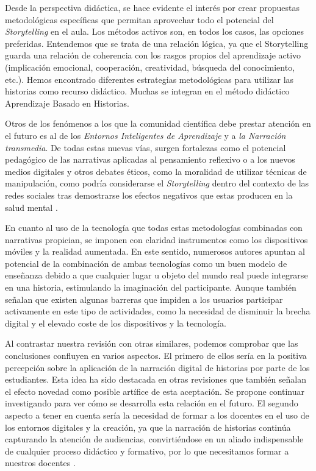 Desde la perspectiva didáctica, se hace evidente el interés por crear
propuestas metodológicas específicas que permitan aprovechar todo el
potencial del \emph{Storytelling} en el aula. Los métodos activos son,
en todos los casos, las opciones preferidas. Entendemos que se trata de
una relación lógica, ya que el Storytelling guarda una relación de
coherencia con los rasgos propios del aprendizaje activo (implicación
emocional, cooperación, creatividad, búsqueda del conocimiento, etc.).
Hemos encontrado diferentes estrategias metodológicas para utilizar las
historias como recurso didáctico. Muchas se integran en el método
didáctico Aprendizaje Basado en Historias.

Otros de los fenómenos a los que la comunidad científica debe prestar
atención en el futuro es al de los \emph{Entornos Inteligentes de
Aprendizaje} y a \emph{la Narración transmedia}. De todas estas nuevas
vías, surgen fortalezas como el potencial pedagógico de las narrativas
aplicadas al pensamiento reflexivo o a los nuevos medios digitales \cite{kim_digital_2021,yasar__2022} y otros debates éticos, como la
moralidad de utilizar técnicas de manipulación, como podría considerarse
el \emph{Storytelling} dentro del contexto de las redes sociales tras
demostrarse los efectos negativos que estas producen en la salud mental
\cite{sheldon_dark_2019}.

En cuanto al uso de la tecnología que todas estas metodologías
combinadas con narrativas propician, se imponen con claridad
instrumentos como los dispositivos móviles y la realidad aumentada. En
este sentido, numerosos autores \cite{aurelia_survey_nodate,dunleavy_augmented_2014,nam_designing_2015,nobrega_mobile_2017} apuntan al potencial de la combinación de ambas tecnologías como un buen modelo de enseñanza debido a que cualquier lugar u objeto del mundo real puede integrarse en una historia, estimulando la imaginación del participante. Aunque también señalan que existen algunas barreras que impiden a los usuarios participar activamente en este tipo de actividades, como la
necesidad de disminuir la brecha digital y el elevado coste de los
dispositivos y la tecnología.

Al contrastar nuestra revisión con otras similares, podemos comprobar
que las conclusiones confluyen en varios aspectos. El primero de ellos
sería en la positiva percepción sobre la aplicación de la narración
digital de historias por parte de los estudiantes. Esta idea ha sido
destacada en otras revisiones que también señalan el efecto novedad como
posible artífice de esta aceptación. Se propone continuar investigando
para ver cómo se desarrolla esta relación en el futuro. El segundo
aspecto a tener en cuenta sería la necesidad de formar a los docentes en
el uso de los entornos digitales y la creación, ya que la narración de
historias continúa capturando la atención de audiencias, convirtiéndose
en un aliado indispensable de cualquier proceso didáctico y formativo,
por lo que necesitamos formar a nuestros docentes \cite{chikasanda_enhancing_2013,lawless_professional_2007}.

